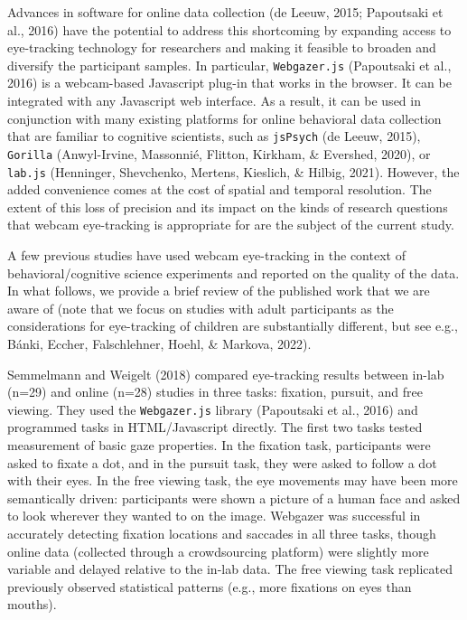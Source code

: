 \documentclass[
  man,floatsintext]{apa6}
\begin{document}
Advances in software for online data collection (de Leeuw, 2015; Papoutsaki et al., 2016) have the potential to address this shortcoming by expanding access to eye-tracking technology for researchers and making it feasible to broaden and diversify the participant samples. In particular, \texttt{Webgazer.js} (Papoutsaki et al., 2016) is a webcam-based Javascript plug-in that works in the browser. It can be integrated with any Javascript web interface. As a result, it can be used in conjunction with many existing platforms for online behavioral data collection that are familiar to cognitive scientists, such as \texttt{jsPsych} (de Leeuw, 2015), \texttt{Gorilla} (Anwyl-Irvine, Massonnié, Flitton, Kirkham, \& Evershed, 2020), or \texttt{lab.js} (Henninger, Shevchenko, Mertens, Kieslich, \& Hilbig, 2021). However, the added convenience comes at the cost of spatial and temporal resolution. The extent of this loss of precision and its impact on the kinds of research questions that webcam eye-tracking is appropriate for are the subject of the current study.

A few previous studies have used webcam eye-tracking in the context of behavioral/cognitive science experiments and reported on the quality of the data. In what follows, we provide a brief review of the published work that we are aware of (note that we focus on studies with adult participants as the considerations for eye-tracking of children are substantially different, but see e.g., Bánki, Eccher, Falschlehner, Hoehl, \& Markova, 2022).

Semmelmann and Weigelt (2018) compared eye-tracking results between in-lab (n=29) and online (n=28) studies in three tasks: fixation, pursuit, and free viewing. They used the \texttt{Webgazer.js} library (Papoutsaki et al., 2016) and programmed tasks in HTML/Javascript directly. The first two tasks tested measurement of basic gaze properties. In the fixation task, participants were asked to fixate a dot, and in the pursuit task, they were asked to follow a dot with their eyes. In the free viewing task, the eye movements may have been more semantically driven: participants were shown a picture of a human face and asked to look wherever they wanted to on the image. Webgazer was successful in accurately detecting fixation locations and saccades in all three tasks, though online data (collected through a crowdsourcing platform) were slightly more variable and delayed relative to the in-lab data. The free viewing task replicated previously observed statistical patterns (e.g., more fixations on eyes than mouths).
\end{document}
